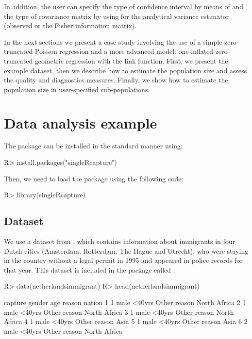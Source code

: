 \documentclass[
]{jss}
\newcommand{\1}{\mathcal{I}} \newcommand{\bZero}{\boldsymbol{0}}
\begin{document}
In addition, the user can specify the type of confidence interval by
means of  and the type of covariance matrix by using
 for the analytical variance estimator (observed or the
Fisher information matrix).

In the next sections we present a case study involving the use of a
simple zero-truncated Poisson regression and a more advanced model:
one-inflated zero-truncated geometric regression with the 
link function. First, we present the example dataset, then we describe
how to estimate the population size and assess the quality and
diagnostics measures. Finally, we show how to estimate the population
size in user-specified sub-populations.

\section{Data analysis example}\label{sec-study}

The package can be installed in the standard manner using:

\begin{CodeChunk}
\begin{CodeInput}
R> install.packages("singleRcapture")
\end{CodeInput}
\end{CodeChunk}

Then, we need to load the package using the following code:

\begin{CodeChunk}
\begin{CodeInput}
R> library(singleRcapture)
\end{CodeInput}
\end{CodeChunk}

\subsection{Dataset}\label{dataset}

We use a dataset from \cite{ztpoisson}, which contains information about
immigrants in four Dutch cities (Amsterdam, Rotterdam, The Hague and
Utrecht), who were staying in the country without a legal permit in 1995
and appeared in police records for that year. This dataset is included
in the package called :

\begin{CodeChunk}
\begin{CodeInput}
R> data(netherlandsimmigrant)
R> head(netherlandsimmigrant)
\end{CodeInput}
\begin{CodeOutput}
  capture gender    age       reason       nation
1       1   male <40yrs Other reason North Africa
2       1   male <40yrs Other reason North Africa
3       1   male <40yrs Other reason North Africa
4       1   male <40yrs Other reason         Asia
5       1   male <40yrs Other reason         Asia
6       2   male <40yrs Other reason North Africa
\end{CodeOutput}
\end{CodeChunk}
\end{document}
